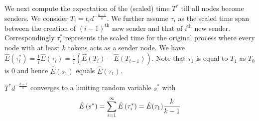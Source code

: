 We next compute the expectation of the (scaled) time $%
T^{\ast }$ till all nodes become senders.  
We consider $T_{i}=t_{i}d^{-\frac{k-1}{k}}$. We further assume $\tau _{i}$ as the
scaled time span between the creation of $(i-1)^\textrm{th}$ new sender and that of $i^\textrm{th}$ new
sender. Correspondingly $\tau _{i}^{\ast }$ represents the scaled time for
the original process where every node with at least $k$ tokens acts as a
sender node.  
We have $\hat E\left( \tau _{i}^{\ast }\right) =%
\frac{1}{i}\hat E\left( \tau _{i}\right) =\frac{1}{i}\left( \hat E%
\left( T_{i}\right) -\hat E\left( T_{i-1}\right) \right)$.  
Note that $\tau _{1}$ is equal to $T_{1}$ as $T_{0}$ is 0 and hence $\hat E(s_1)$ equals $\hat E(\tau _1)$.
\begin{theorem}
\label{theorem-2} $T^{\ast }d^{-\frac{k-1}{k}}$ converges to a limiting
random variable $s^{\ast }$ with 
\begin{equation*}
\vspace{-.3cm}
\hat E \left( s^{\ast }\right) =\sum\limits_{i=1}^{\infty }\hat E%
\left( \tau _{i}^{\ast}\right) = \hat E(\tau_1)\frac{k}{k-1}
\end{equation*}
\end{theorem}

